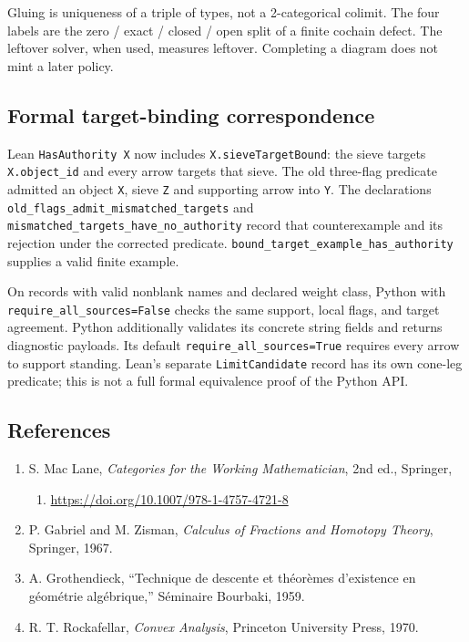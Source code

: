 \documentclass[
  11pt,
]{article}
\providecommand{\tightlist}{%
  \setlength{\itemsep}{0pt}\setlength{\parskip}{0pt}}
\begin{document}
Gluing is uniqueness of a triple of types, not a 2-categorical colimit. The four labels are the zero / exact / closed / open split of a finite cochain defect. The leftover solver, when used, measures leftover. Completing a diagram does not mint a later policy.

\subsection{Formal target-binding correspondence}\label{formal-target-binding-correspondence}

Lean \texttt{HasAuthority\ X} now includes \texttt{X.sieveTargetBound}: the sieve targets \texttt{X.object\_id} and every arrow targets that sieve. The old three-flag predicate admitted an object \texttt{X}, sieve \texttt{Z} and supporting arrow into \texttt{Y}. The declarations \nolinkurl{old_flags_admit_mismatched_targets} and \nolinkurl{mismatched_targets_have_no_authority} record that counterexample and its rejection under the corrected predicate. \nolinkurl{bound_target_example_has_authority} supplies a valid finite example.

On records with valid nonblank names and declared weight class, Python with \texttt{require\_all\_sources=False} checks the same support, local flags, and target agreement. Python additionally validates its concrete string fields and returns diagnostic payloads. Its default \texttt{require\_all\_sources=True} requires every arrow to support standing. Lean's separate \texttt{LimitCandidate} record has its own cone-leg predicate; this is not a full formal equivalence proof of the Python API.

\subsection{References}\label{references}

\begin{enumerate}
\def\labelenumi{\arabic{enumi}.}
\tightlist
\item
  S. Mac Lane, \emph{Categories for the Working Mathematician}, 2nd ed., Springer,

  \begin{enumerate}
  \def\labelenumii{\arabic{enumii}.}
  \setcounter{enumii}{1997}
  \tightlist
  \item
    \url{https://doi.org/10.1007/978-1-4757-4721-8}
  \end{enumerate}
\item
  P. Gabriel and M. Zisman, \emph{Calculus of Fractions and Homotopy Theory}, Springer, 1967.
\item
  A. Grothendieck, ``Technique de descente et théorèmes d'existence en géométrie algébrique,'' Séminaire Bourbaki, 1959.
\item
  R. T. Rockafellar, \emph{Convex Analysis}, Princeton University Press, 1970.
\end{enumerate}
\end{document}
